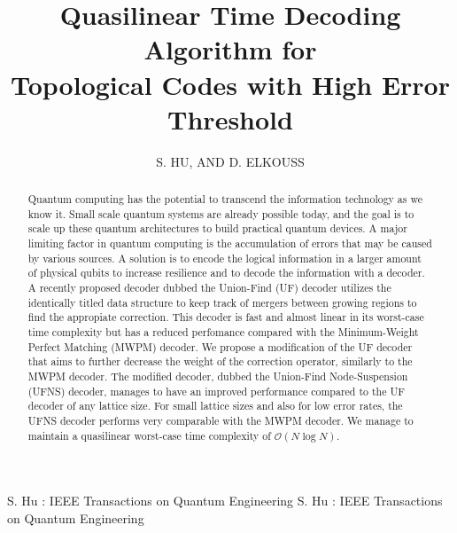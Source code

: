 \documentclass{ieeeaccess}
\newcommand{\m}[1]{\mathcal{#1}}
\begin{document}

\title{Quasilinear Time Decoding Algorithm for \\Topological Codes with High Error Threshold}
\author{
    \uppercase{S. Hu},
    \uppercase{and D. Elkouss}
}
\address[1]{Department of Physics, Delft University of Technology (email: watermarkhu@outlook.com)}
\address[2]{QuTech, Delft University of Technology, Lorentzweg 1
2628CJ Delft, The Netherlands (email: d.elkousscoronas@qutech.nl)}


\markboth
{S. Hu \headeretal: IEEE Transactions on Quantum Engineering}
{S. Hu \headeretal: IEEE Transactions on Quantum Engineering}


\begin{abstract}
    Quantum computing has the potential to transcend the information technology as we know it. Small scale quantum systems are already possible today, and the goal is to scale up these quantum architectures to build practical quantum devices. A major limiting factor in quantum computing is the accumulation of errors that may be caused by various sources. A solution is to encode the logical information in a larger amount of physical qubits to increase resilience and to decode the information with a decoder. A recently proposed decoder dubbed the Union-Find (UF) decoder utilizes the identically titled data structure to keep track of mergers between growing regions to find the appropiate correction. This decoder is fast and almost linear in its worst-case time complexity but has a reduced perfomance compared with the Minimum-Weight Perfect Matching (MWPM) decoder. We propose a modification of the UF decoder that aims to further decrease the weight of the correction operator, similarly to the MWPM decoder. The modified decoder, dubbed the Union-Find Node-Suspension (UFNS) decoder, manages to have an improved performance compared to the UF decoder of any lattice size. For small lattice sizes and also for low error rates, the UFNS decoder performs very comparable with the MWPM decoder. We manage to maintain a quasilinear worst-case time complexity of $\m{O}(N\log{N})$. 
\end{abstract}
\end{document}
